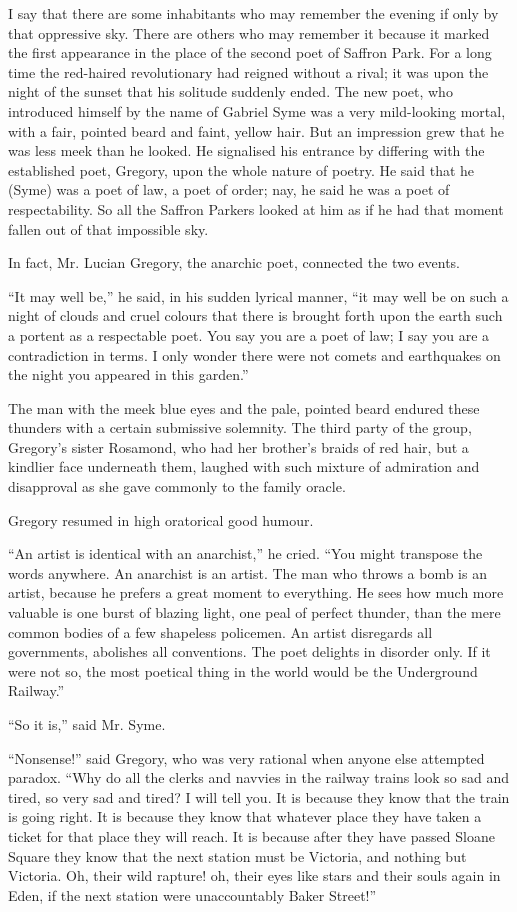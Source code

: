 I say that there are some inhabitants who may remember the evening if only by that oppressive sky. There are others who may remember it because it marked the first appearance in the place of the second poet of Saffron Park. For a long time the red-haired revolutionary had reigned without a rival; it was upon the night of the sunset that his solitude suddenly ended. The new poet, who introduced himself by the name of Gabriel Syme was a very mild-looking mortal, with a fair, pointed beard and faint, yellow hair. But an impression grew that he was less meek than he looked. He signalised his entrance by differing with the established poet, Gregory, upon the whole nature of poetry. He said that he (Syme) was a poet of law, a poet of order; nay, he said he was a poet of respectability. So all the Saffron Parkers looked at him as if he had that moment fallen out of that impossible sky.

In fact, Mr. Lucian Gregory, the anarchic poet, connected the two events.

“It may well be,” he said, in his sudden lyrical manner, “it may well be on such a night of clouds and cruel colours that there is brought forth upon the earth such a portent as a respectable poet. You say you are a poet of law; I say you are a contradiction in terms. I only wonder there were not comets and earthquakes on the night you appeared in this garden.”

The man with the meek blue eyes and the pale, pointed beard endured these thunders with a certain submissive solemnity. The third party of the group, Gregory’s sister Rosamond, who had her brother’s braids of red hair, but a kindlier face underneath them, laughed with such mixture of admiration and disapproval as she gave commonly to the family oracle.

Gregory resumed in high oratorical good humour.

“An artist is identical with an anarchist,” he cried. “You might transpose the words anywhere. An anarchist is an artist. The man who throws a bomb is an artist, because he prefers a great moment to everything. He sees how much more valuable is one burst of blazing light, one peal of perfect thunder, than the mere common bodies of a few shapeless policemen. An artist disregards all governments, abolishes all conventions. The poet delights in disorder only. If it were not so, the most poetical thing in the world would be the Underground Railway.”

“So it is,” said Mr. Syme.

“Nonsense!” said Gregory, who was very rational when anyone else attempted paradox. “Why do all the clerks and navvies in the railway trains look so sad and tired, so very sad and tired? I will tell you. It is because they know that the train is going right. It is because they know that whatever place they have taken a ticket for that place they will reach. It is because after they have passed Sloane Square they know that the next station must be Victoria, and nothing but Victoria. Oh, their wild rapture! oh, their eyes like stars and their souls again in Eden, if the next station were unaccountably Baker Street!”

